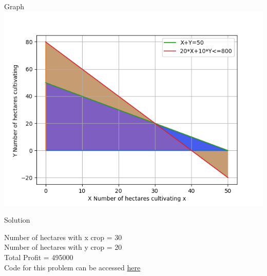 \documentclass{beamer}
\begin{document}
\begin{frame}{Graph}
\includegraphics[scale=0.6]{Figure_1.png}
\end{frame}
\begin{frame}{Solution}

Number of hectares with x crop = 30\\
Number of hectares with y crop = 20\\
Total Profit = 495000\\
\vspace{0.3cm}
\vspace{0.3cm}
\small{Code for this problem can be accessed  \href{https://github.com/gouthamagv/Optimisation_GVV/blob/master/7.8.py}{here}}

\end{frame}
\end{document}
